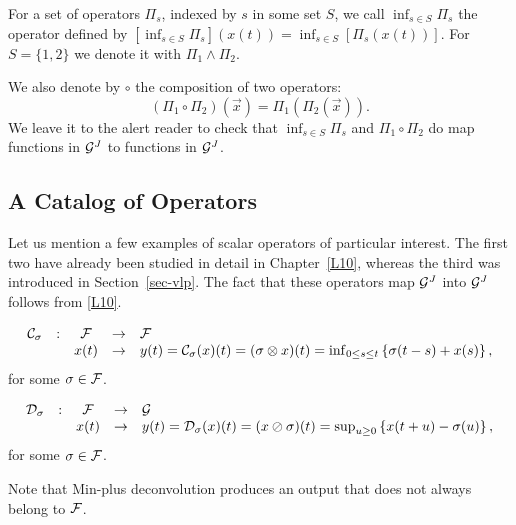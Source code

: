For a set of operators $\Pi_s$, indexed by $s$ in some set $S$, we
call $\inf_{s \in S} \Pi_s$ the operator defined by $[\inf_{s \in
S} \Pi_s](x(t))=\inf_{s \in S} [\Pi_s (x(t))]$. For $S=\{1,2\}$ we
denote it with $\Pi_1 \wedge \Pi_2$.

We also denote by $\circ$ the composition of two operators:
$$ (\Pi_1 \circ \Pi_2)(\vec{x}) = \Pi_1(\Pi_2(\vec{x})). $$
We leave it to the alert reader to check that $\inf_{s \in S}
\Pi_s$ and $\Pi_1 \circ \Pi_2$ do map functions in $\mathcal G^J$ to
functions in $\mathcal G^J$.

\subsection{A Catalog of Operators}

Let us mention a few examples of scalar operators of particular
interest. The first two have already been studied in detail in
Chapter~\ref{L10}, whereas the third was introduced in
Section~\ref{sec-vlp}. The fact that these operators map $\mathcal G^J$
into $\mathcal G^J$ follows from \cref{L10}.



\begin{definition}
$$ \begin{array}{ccccl}
\mathcal C_\sigma & : & \mathcal F & \rightarrow & \mathcal F \\
        & & x(t) & \rightarrow & y(t) = \mathcal C_\sigma (x)(t) = (\sigma \otimes x)(t) = \inf_{0 \leq s \leq t} \left\{ \sigma(t-s) + x(s) \right\},
\end{array} $$
for some $\sigma \in \mathcal F$.
\end{definition}


\begin{definition}
$$ \begin{array}{ccccl}
\mathcal D_\sigma & : & \mathcal F & \rightarrow & \mathcal G \\
        & & x(t) & \rightarrow & y(t) = \mathcal D_\sigma (x)(t) = (x \oslash \sigma)(t) = \sup_{u \geq 0} \left\{ x(t+u) - \sigma(u) \right\},
\end{array} $$
for some $\sigma \in \mathcal F$.
\end{definition}
Note that Min-plus deconvolution produces an output that does not always belong to $\mathcal F$.

